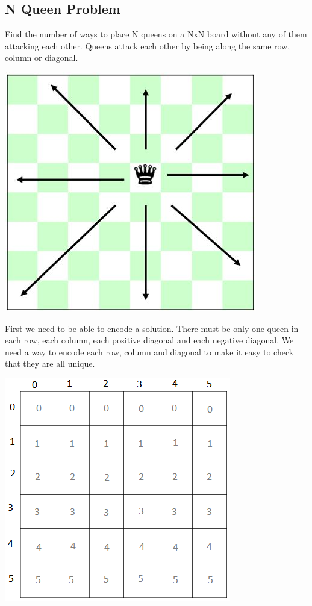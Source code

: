 \documentclass[11pt,oneside]{book}
\makeatletter
\def\maxwidth#1{\ifdim\Gin@nat@width>#1 #1\else\Gin@nat@width\fi}
\makeatother
\begin{document}
\subsection{N Queen Problem}

Find the number of ways to place N queens on a NxN board without any of them attacking each other. Queens attack each other by being along the same row, column or diagonal.

\vspace{5px}\includegraphics[width=\maxwidth{\textwidth}]{nqueen.jpg}

First we need to be able to encode a solution. There must be only one queen in each row, each column, each positive diagonal and each negative diagonal. We need a way to encode each row, column and diagonal to make it easy to check that they are all unique.

\vspace{5px}\includegraphics[width=\maxwidth{\textwidth}]{nqueen3.png}
\end{document}
